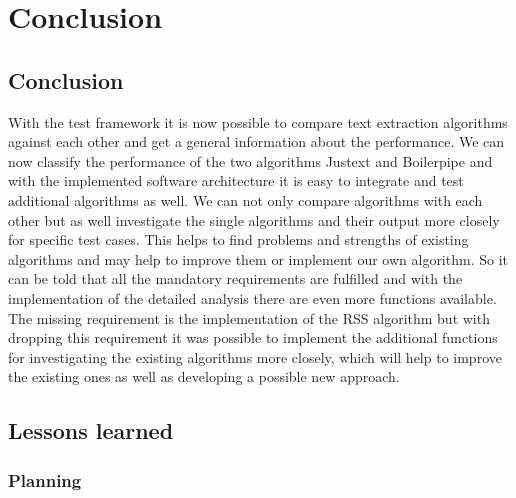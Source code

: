 
\chapter{Conclusion} %

\label{Conclusion} %



\section {Conclusion}

With the test framework it is now possible to compare text extraction algorithms against each other and get a general information about the performance. We can now classify the performance of the two algorithms Justext and Boilerpipe and with the implemented software architecture it is easy to integrate and test additional algorithms as well. We can not only compare algorithms with each other but as well investigate the single algorithms and their output more closely for specific test cases. This helps to find problems and strengths of existing algorithms and may help to improve them or implement our own algorithm. So it can be told that all the mandatory requirements are fulfilled and with the implementation of the detailed analysis there are even more functions available. 
The missing requirement is the implementation of the RSS algorithm but with dropping this requirement it was possible to implement the additional functions for investigating the existing algorithms more closely, which will help to improve the existing ones as well as developing a possible new approach.

\section{Lessons learned}

\subsection{Planning}

